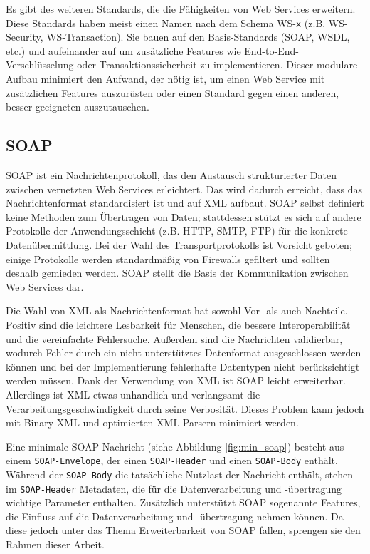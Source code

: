 \documentclass[runningheads]{llncs}
\newcommand{\germanquote}[1]{\glqq{}#1\grqq{}}
\begin{document}
    Es gibt des weiteren Standards, die die Fähigkeiten von Web Services erweitern. Diese Standards
    haben meist einen Namen nach dem Schema \germanquote{WS-\texttt{x}} (z.B. WS-Security,
    WS-Transaction). Sie bauen auf den Basis-Standards (SOAP, WSDL, etc.) und aufeinander auf um
    zusätzliche Features wie End-to-End-Verschlüsselung oder Transaktionssicherheit zu
    implementieren. Dieser modulare Aufbau minimiert den Aufwand, der nötig ist, um einen Web
    Service mit zusätzlichen Features auszurüsten oder einen Standard gegen einen anderen, besser
    geeigneten auszutauschen.

  \label{soap}
  \subsection{SOAP}
  \nocite{wfm_site}
  \nocite{wk_soap}
    SOAP ist ein Nachrichtenprotokoll, das den Austausch strukturierter Daten zwischen vernetzten
    Web Services erleichtert. Das wird dadurch erreicht, dass das Nachrichtenformat standardisiert
    ist und auf XML aufbaut. SOAP selbst definiert keine Methoden zum Übertragen von Daten;
    stattdessen stützt es sich auf andere Protokolle der Anwendungsschicht (z.B. HTTP, SMTP, FTP)
    für die konkrete Datenübermittlung. Bei der Wahl des Transportprotokolls ist Vorsicht geboten;
    einige Protokolle werden standardmäßig von Firewalls gefiltert und sollten deshalb gemieden
    werden. SOAP stellt die Basis der Kommunikation zwischen Web Services dar.

    Die Wahl von XML als Nachrichtenformat hat sowohl Vor- als auch Nachteile. Positiv sind die
    leichtere Lesbarkeit für Menschen, die bessere Interoperabilität und die vereinfachte
    Fehlersuche. Außerdem sind die Nachrichten validierbar, wodurch Fehler durch ein nicht
    unterstütztes Datenformat ausgeschlossen werden können und bei der Implementierung fehlerhafte
    Datentypen nicht berücksichtigt werden müssen. Dank der Verwendung von XML ist SOAP leicht
    erweiterbar. Allerdings ist XML etwas unhandlich und verlangsamt die
    Verarbeitungsgeschwindigkeit durch seine Verbosität. Dieses Problem kann jedoch mit Binary XML
    und optimierten XML-Parsern minimiert werden.

    Eine minimale SOAP-Nachricht (siehe Abbildung \ref{fig:min_soap}) besteht aus einem
    \texttt{SOAP-\linebreak[0]Envelope}, der einen \texttt{SOAP-\linebreak[0]Header} und einen
    \texttt{SOAP-\linebreak[0]Body} enthält. Während der \texttt{SOAP-\linebreak[0]Body} die
    tatsächliche Nutzlast der Nachricht enthält, stehen im \texttt{SOAP-\linebreak[0]Header}
    Metadaten, die für die Datenverarbeitung und -übertragung wichtige Parameter enthalten.
    Zusätzlich unterstützt SOAP sogenannte \germanquote{Features}, die Einfluss auf die
    Datenverarbeitung und -übertragung nehmen können. Da diese jedoch unter das Thema
    \germanquote{Erweiterbarkeit von SOAP} fallen, sprengen sie den Rahmen dieser Arbeit.
\end{document}
